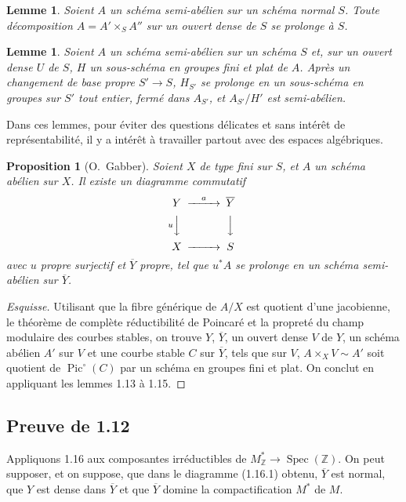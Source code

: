 \documentclass[12pt,a4paper]{article}
\theoremstyle{plain}
\newtheorem{lemma}[theorem]{Lemme}
\newtheorem{proposition}[theorem]{Proposition}
\theoremstyle{definition}
\theoremstyle{remark}
\DeclareMathOperator{\Spec}{Spec}
\DeclareMathOperator{\Pic}{Pic}
\newcommand{\ZZ}{\mathbb{Z}}
\providecommand{\ZZ}{\mathbb{Z}}
\providecommand{\Spec}{\operatorname{Spec}}
\begin{document}
\begin{lemma}
Soient $A$ un schéma semi-abélien sur un schéma normal $S$. Toute décomposition $A = A' \times_S A''$ sur un ouvert dense de $S$ se prolonge à $S$.
\end{lemma}

\begin{lemma}
Soient $A$ un schéma semi-abélien sur un schéma $S$ et, sur un ouvert dense $U$ de $S$, $H$ un sous-schéma en groupes fini et plat de $A$. Après un changement de base propre $S' \to S$, $H_{S'}$ se prolonge en un sous-schéma en groupes sur $S'$ tout entier, fermé dans $A_{S'}$, et $A_{S'}/H'$ est semi-abélien.
\end{lemma}

Dans ces lemmes, pour éviter des questions délicates et sans intérêt de représentabilité, il y a intérêt à travailler partout avec des espaces algébriques.

\begin{proposition}[O.~Gabber]
Soient $X$ de type fini sur $S$, et $A$ un schéma abélien sur $X$. Il existe un diagramme commutatif
\[
\begin{CD}
Y @>a>> \overline{Y} \\
@Vu VV @VVV \\
X @>>> S
\end{CD}
\]
avec $u$ propre surjectif et $\overline{Y}$ propre, tel que $u^*A$ se prolonge en un schéma semi-abélien sur $\overline{Y}$.
\end{proposition}

\begin{proof}[Esquisse]
Utilisant que la fibre générique de $A/X$ est quotient d'une jacobienne, le théorème de complète réductibilité de Poincaré et la propreté du champ modulaire des courbes stables, on trouve $Y$, $\overline{Y}$, un ouvert dense $V$ de $Y$, un schéma abélien $A'$ sur $V$ et une courbe stable $C$ sur $\overline{Y}$, tels que sur $V$, $A \times_X V \sim A'$ soit quotient de $\Pic^\circ(C)$ par un schéma en groupes fini et plat. On conclut en appliquant les lemmes 1.13 à 1.15.
\end{proof}

\subsection{Preuve de 1.12}

Appliquons 1.16 aux composantes irréductibles de $M^*_{\ZZ} \to \Spec(\ZZ)$. On peut supposer, et on suppose, que dans le diagramme (1.16.1) obtenu, $\overline{Y}$ est normal, que $Y$ est dense dans $\overline{Y}$ et que $\overline{Y}$ domine la compactification $M^*$ de $M$.
\end{document}
